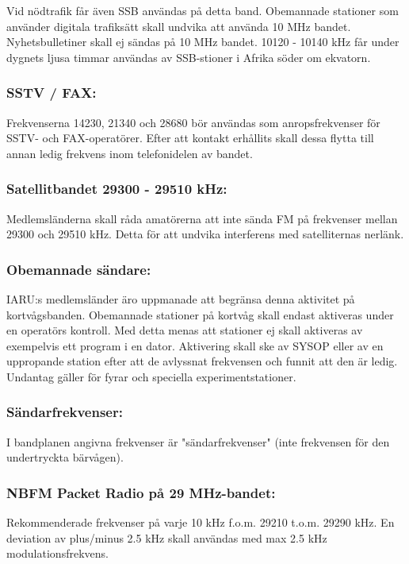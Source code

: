 Vid nödtrafik får även SSB användas på detta band. Obemannade
stationer som använder digitala trafiksätt skall undvika att
använda 10 MHz bandet.
Nyhetsbulletiner skall ej sändas på 10 MHz bandet.
10120 - 10140 kHz får under dygnets ljusa timmar användas av
SSB-stioner i Afrika söder om ekvatorn.

\subsubsection{SSTV / FAX:}

Frekvenserna 14230, 21340 och 28680 bör användas
som anropsfrekvenser för SSTV- och FAX-operatörer.
Efter att kontakt erhållits skall dessa flytta till annan
ledig frekvens inom telefonidelen av bandet.

\subsubsection{Satellitbandet 29300 - 29510 kHz:}

Medlemsländerna skall råda amatörerna att inte sända
FM på frekvenser mellan 29300 och 29510 kHz. Detta
för att undvika interferens med satelliternas nerlänk.

\subsubsection{Obemannade sändare:}

IARU:s medlemsländer äro uppmanade att begränsa
denna aktivitet på kortvågsbanden.
Obemannade stationer på kortvåg skall endast aktiveras under en operatörs kontroll.
Med detta menas att stationer ej skall aktiveras av
exempelvis ett program i en dator. Aktivering skall ske
av SYSOP eller av en uppropande station efter att de
avlyssnat frekvensen och funnit att den är ledig.
Undantag gäller för fyrar och speciella experimentstationer.

\subsubsection{Sändarfrekvenser:}

I bandplanen angivna frekvenser är "sändarfrekvenser"
(inte frekvensen för den undertryckta bärvågen).

\subsubsection{NBFM Packet Radio på 29 MHz-bandet:}

Rekommenderade frekvenser på varje 10 kHz f.o.m.
29210 t.o.m. 29290 kHz. En deviation av plus/minus 2.5
kHz skall användas med max 2.5 kHz modulationsfrekvens.
